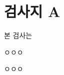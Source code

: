 \documentclass{article}
\begin{document}
\part{검사지 A}
본 검사는



\newpage
ㅇㅇㅇ



\newpage
ㅇㅇㅇ
\end{document}
